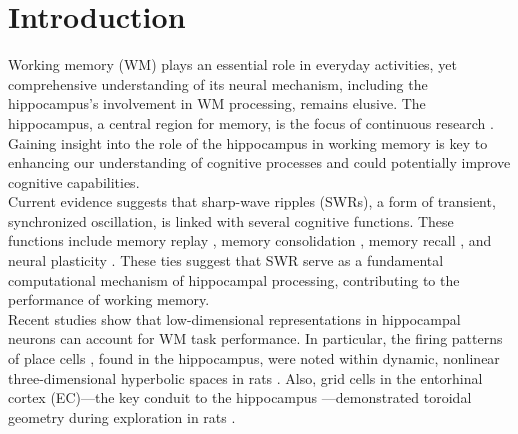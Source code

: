\documentclass[final,3p,times,twocolumn]{elsarticle}
\begin{document}
\section{Introduction}
Working memory (WM) plays an essential role in everyday activities, yet comprehensive understanding of its neural mechanism, including the hippocampus's involvement in WM processing, remains elusive. The hippocampus, a central region for memory, is the focus of continuous research \cite{scoville_loss_1957} \cite{squire_legacy_2009}  \cite{boran_persistent_2019} \cite{kaminski_persistently_2017} \cite{kornblith_persistent_2017} \cite{faraut_dataset_2018} \cite{borders_hippocampus_2022} \cite{li_functional_2023} \cite{dimakopoulos_information_2022}. Gaining insight into the role of the hippocampus in working memory is key to enhancing our understanding of cognitive processes and could potentially improve cognitive capabilities.
\\
\indent
Current evidence suggests that sharp-wave ripples (SWRs), a form of transient, synchronized oscillation, is linked with several cognitive functions. These functions include memory replay \cite{wilson_reactivation_1994} \cite{nadasdy_replay_1999} \cite{lee_memory_2002} \cite{diba_forward_2007} \cite{davidson_hippocampal_2009}, memory consolidation \cite{girardeau_selective_2009} \cite{ego-stengel_disruption_2010} \cite{fernandez-ruiz_long-duration_2019} \cite{kim_corticalhippocampal_2022}, memory recall \cite{wu_hippocampal_2017} \cite{norman_hippocampal_2019} \cite{norman_hippocampal_2021}, and neural plasticity \cite{behrens_induction_2005} \cite{norimoto_hippocampal_2018}. These ties suggest that SWR serve as a fundamental computational mechanism of hippocampal processing, contributing to the performance of working memory.
\\
\indent
Recent studies show that low-dimensional representations in hippocampal neurons can account for WM task performance. In particular, the firing patterns of place cells \cite{okeefe_hippocampus_1971} \cite{okeefe_place_1976} \cite{ekstrom_cellular_2003} \cite{kjelstrup_finite_2008} \cite{harvey_intracellular_2009}, found in the hippocampus, were noted within dynamic, nonlinear three-dimensional hyperbolic spaces in rats \cite{zhang_hippocampal_2022}. Also, grid cells in the entorhinal cortex (EC)—the key conduit to the hippocampus \cite{naber_reciprocal_2001} \cite{van_strien_anatomy_2009} \cite{strange_functional_2014}—demonstrated toroidal geometry during exploration in rats \cite{gardner_toroidal_2022}.
\end{document}
